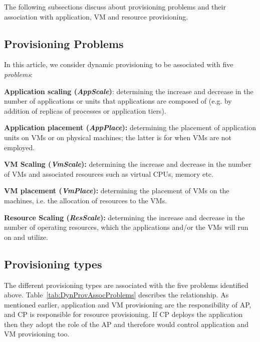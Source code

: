 \documentclass[10pt,journal,cspaper,compsoc]{IEEEtran}
\begin{document}
The following subsections discuss about provisioning problems and their association with application, VM and resource provisioning.

\subsection{Provisioning Problems}
\label{subsec:ProvProblems}
In this article, we consider dynamic provisioning to be associated with five \emph{problems}:
\begin{IEEEenumerate}
\item \textbf{Application scaling (\emph{AppScale})}: determining the increase and decrease in the number of applications or units that applications are composed of (e.g. by addition of replicas of processes or application tiers).
\item \textbf{Application placement (\emph{AppPlace}):} determining the placement of application units on VMs or on physical machines; the latter is for when VMs are not employed.
\item \textbf{VM Scaling (\emph{VmScale}):} determining the increase and decrease in the number of VMs and associated resources such as virtual CPUs, memory etc.
\item \textbf{VM placement (\emph{VmPlace}):} determining the placement of VMs on the machines, i.e. the allocation of resources to the VMs.
\item \textbf{Resource Scaling (\emph{ResScale}):} determining the increase and decrease in the number of operating resources, which the applications and/or the VMs will run on and utilize.
\end{IEEEenumerate}

\subsection{Provisioning types}
\label{subsec:ProvisioningTypes}
The different provisioning types are associated with the five problems identified above. Table~\ref{tab:DynProvAssocProblems} describes the relationship. As mentioned earlier, application and VM provisioning are the responsibility of AP, and CP is responsible for resource provisioning. If CP deploys the application then they adopt the role of the AP and therefore would control application and VM provisioning too.
\end{document}
